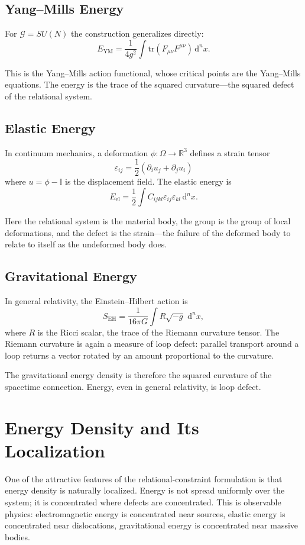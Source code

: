 \documentclass[12pt,a4paper,openany]{book}
\theoremstyle{plain}
\theoremstyle{definition}
\theoremstyle{remark}
\newcommand{\GG}{\mathcal{G}}
\newcommand{\RR}{\mathbb{R}}
\newcommand{\id}{\mathbb{I}}
\newcommand{\Energy}{E}
\newcommand{\dvol}{\,\mathrm{d}^n x}
\newcommand{\del}{\partial}
\begin{document}
\subsection{Yang--Mills Energy}

For $\GG = SU(N)$ the construction generalizes directly:
\[
\Energy_\text{YM} = \frac{1}{4g^2} \int \mathrm{tr}(F_{\mu\nu} F^{\mu\nu}) \dvol.
\]

This is the Yang--Mills action functional, whose critical points are the Yang--Mills equations. The energy is the trace of the squared curvature---the squared defect of the relational system.

\subsection{Elastic Energy}

In continuum mechanics, a deformation $\phi : \Omega \to \RR^3$ defines a strain tensor
\[
\varepsilon_{ij} = \frac{1}{2}\!\left(\del_i u_j + \del_j u_i\right)
\]
where $u = \phi - \id$ is the displacement field. The elastic energy is
\[
\Energy_\text{el} = \frac{1}{2} \int C_{ijkl} \varepsilon_{ij} \varepsilon_{kl} \dvol.
\]

Here the relational system is the material body, the group is the group of local deformations, and the defect is the strain---the failure of the deformed body to relate to itself as the undeformed body does.

\subsection{Gravitational Energy}

In general relativity, the Einstein--Hilbert action is
\[
S_\text{EH} = \frac{1}{16\pi G} \int R \sqrt{-g} \, \dvol,
\]
where $R$ is the Ricci scalar, the trace of the Riemann curvature tensor. The Riemann curvature is again a measure of loop defect: parallel transport around a loop returns a vector rotated by an amount proportional to the curvature.

The gravitational energy density is therefore the squared curvature of the spacetime connection. Energy, even in general relativity, is loop defect.

\section{Energy Density and Its Localization}

One of the attractive features of the relational-constraint formulation is that energy density is naturally localized. Energy is not spread uniformly over the system; it is concentrated where defects are concentrated. This is observable physics: electromagnetic energy is concentrated near sources, elastic energy is concentrated near dislocations, gravitational energy is concentrated near massive bodies.
\end{document}
